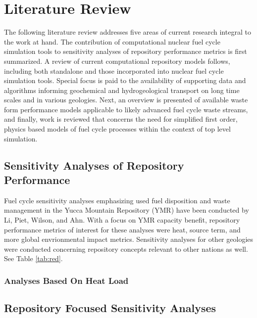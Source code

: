 \chapter{Literature Review}
The following literature review addresses five areas of current research integral to the work at 
hand. The contribution of computational nuclear fuel cycle simulation tools to sensitivity analyses 
of repository performance metrics is first summarized. A review of current computational repository 
models follows, including both standalone and those incorporated into nuclear fuel cycle simulation 
tools. Special focus is paid to the availability of supporting data and algorithms informing 
geochemical and hydrogeological transport on long time scales and in various geologies. Next, an 
overview is presented of available waste form performance models applicable to likely advanced fuel 
cycle waste streams, and finally, work is reviewed that concerns the need for simplified first 
order, physics based models of fuel cycle processes within the context of top level simulation.  
\section{Sensitivity Analyses of Repository Performance} Fuel cycle sensitivity analyses emphasizing 
used fuel disposition and waste management in the Yucca Mountain Repository (YMR) have been 
conducted by Li, Piet, Wilson, and Ahn. With a focus on YMR capacity benefit, repository performance 
metrics of interest for these analyses were heat, source term, and more global envrionmental impact 
metrics. Sensitivity analyses for other geologies were conducted concerning repository concepts 
relevant to other nations as well. See Table \ref{tab:red}.





\subsection{Analyses Based On Heat Load}

\section{Repository Focused Sensitivity Analyses}
